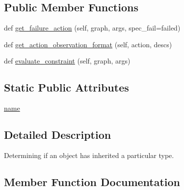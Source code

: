 \subsection*{Public Member Functions}
\begin{DoxyCompactItemize}
\item 
def \hyperlink{classlight__chats_1_1graph_1_1IsTypeConstraint_a0d16b081fd2f7d73ed7e0414cd518f1e}{get\+\_\+failure\+\_\+action} (self, graph, args, spec\+\_\+fail=\textquotesingle{}failed\textquotesingle{})
\item 
def \hyperlink{classlight__chats_1_1graph_1_1IsTypeConstraint_a1443cca8a343b530929093446b1b914f}{get\+\_\+action\+\_\+observation\+\_\+format} (self, action, descs)
\item 
def \hyperlink{classlight__chats_1_1graph_1_1IsTypeConstraint_aad886d877405c19204a37f2f7cf34db9}{evaluate\+\_\+constraint} (self, graph, args)
\end{DoxyCompactItemize}
\subsection*{Static Public Attributes}
\begin{DoxyCompactItemize}
\item 
\hyperlink{classlight__chats_1_1graph_1_1IsTypeConstraint_a1378fd0e57416b317a7754d3059a65ff}{name}
\end{DoxyCompactItemize}


\subsection{Detailed Description}
\begin{DoxyVerb}Determining if an object has inherited a particular type.
\end{DoxyVerb}
 

\subsection{Member Function Documentation}
\mbox{\label{classlight__chats_1_1graph_1_1IsTypeConstraint_aad886d877405c19204a37f2f7cf34db9}} 

